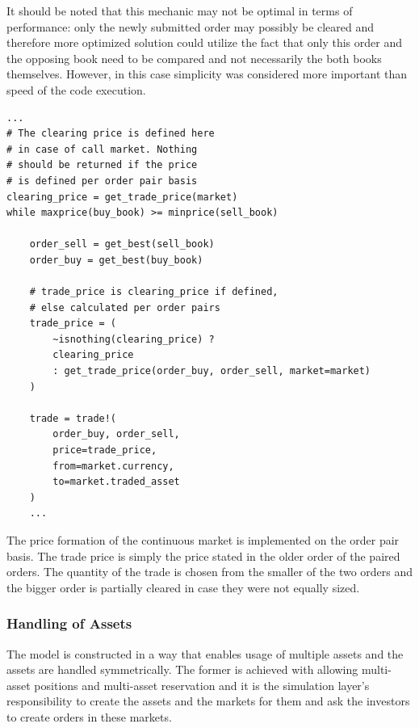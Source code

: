 It should be noted that this mechanic may not be optimal in terms of performance: 
only the newly submitted order may possibly be cleared and therefore more 
optimized solution could utilize the fact that only this order and the opposing book 
need to be compared and not necessarily the both books themselves. However, 
in this case simplicity was considered more important than speed of the code execution.


\begin{lstlisting}[caption={Clearing process},label={lst:clearing}]
...
# The clearing price is defined here
# in case of call market. Nothing
# should be returned if the price
# is defined per order pair basis
clearing_price = get_trade_price(market)
while maxprice(buy_book) >= minprice(sell_book)

    order_sell = get_best(sell_book)
    order_buy = get_best(buy_book)
    
    # trade_price is clearing_price if defined,
    # else calculated per order pairs
    trade_price = (
        ~isnothing(clearing_price) ? 
        clearing_price
        : get_trade_price(order_buy, order_sell, market=market)
    )

    trade = trade!(
        order_buy, order_sell, 
        price=trade_price, 
        from=market.currency, 
        to=market.traded_asset
    )
    ...
\end{lstlisting}

The price formation of the continuous market is implemented
on the order pair basis. The trade price is simply the price
stated in the older order of the paired orders. %
The quantity of the trade is chosen from the smaller of the two orders
and the bigger order is partially cleared in case they were not 
equally sized.



\subsubsection{Handling of Assets}

The model is constructed in a way that enables usage of multiple assets
and the assets are handled symmetrically. The former is achieved with
allowing multi-asset positions and multi-asset reservation and 
it is the simulation layer's responsibility to create the assets and the 
markets for them and ask the investors to create orders in these markets. 

